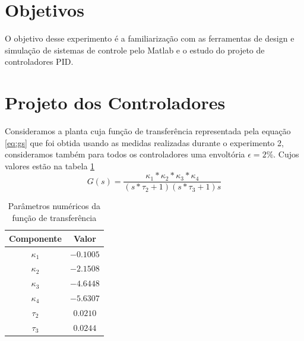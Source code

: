 \documentclass{article}
\begin{document}


\onehalfspacing
\section{Objetivos} 
O objetivo desse experimento é a familiarização com as ferramentas de design e simulação de sistemas de controle pelo Matlab e o estudo do projeto de controladores PID. 
	
\section{Projeto dos Controladores}
Consideramos a planta cuja função de transferência representada pela equação \ref{eq:gs} que foi obtida usando as medidas realizadas durante o experimento 2, consideramos também para todos os controladores uma envoltória $\epsilon = 2\%$. Cujos valores estão na tabela \ref{tab:valores}\\

\begin{equation}
\label{eq:gs}
G(s) = \frac{\kappa_1*\kappa_2*\kappa_3*\kappa_4}{(s*\tau_2 + 1)(s*\tau_3 + 1)s}
\end{equation}

\begin{table}[H]
\centering
\caption{Parâmetros numéricos da função de transferência}
\label{tab:valores}
\begin{tabular}{|c|c|}
	\hline Componente & Valor \\ 
	\hline $\kappa_1$ & $-0.1005$\\ 
	\hline $\kappa_2$ & $-2.1508$\\ 
	\hline $\kappa_3$ & $-4.6448$\\ 
	\hline $\kappa_4$ & $-5.6307$\\ 
	\hline $\tau_2$ & $0.0210$\\ 
	\hline $\tau_3$ & $0.0244$ \\ 	
	\hline 
\end{tabular} 
\end{table}
\end{document}
